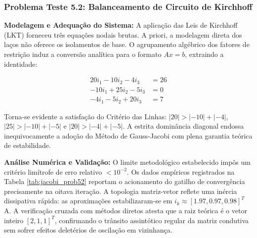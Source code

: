 \subsubsection{Problema Teste 5.2: Balanceamento de Circuito de Kirchhoff}

\textbf{Modelagem e Adequação do Sistema:} A aplicação das Leis de Kirchhoff (LKT) forneceu três equações nodais brutas. A priori, a modelagem direta dos laços não oferece os isolamentos de base. O agrupamento algébrico dos fatores de restrição induz a conversão analítica para o formato $Ax = b$, extraindo a identidade:

\begin{align*}
    20 i_1 - 10 i_2 - 4 i_3 &= 26 \\
    -10 i_1 + 25 i_2 - 5 i_3 &= 0 \\
    -4 i_1 - 5 i_2 + 20 i_3 &= 7
\end{align*}

Torna-se evidente a satisfação do Critério das Linhas: $|20| > |-10| + |-4|$, $|25| > |-10| + |-5|$ e $|20| > |-4| + |-5|$. A estrita dominância diagonal endossa inequivocamente a adoção do Método de Gauss-Jacobi com plena garantia teórica de estabilidade.

\begin{table}[H]
\centering
\caption{Registros Críticos do Método de Gauss-Jacobi (Problema 5.2)}
\label{tab:jacobi_prob52}
\end{table}

\textbf{Análise Numérica e Validação:} O limite metodológico estabelecido impôs um critério limítrofe de erro relativo $< 10^{-2}$. Os dados empíricos registrados na Tabela \ref{tab:jacobi_prob52} reportam o acionamento do gatilho de convergência precisamente na oitava iteração. A topologia matriz-vetor reflete uma inércia dissipativa rápida: as aproximações estabilizaram-se em $i_k \approx[1.97, 0.97, 0.98]^T$ A. A verificação cruzada com métodos diretos atesta que a raiz teórica é o vetor inteiro $[2, 1, 1]^T$, confirmando o trânsito assintótico regular da matriz condutiva sem sofrer efeitos deletérios de oscilação em vizinhança.


